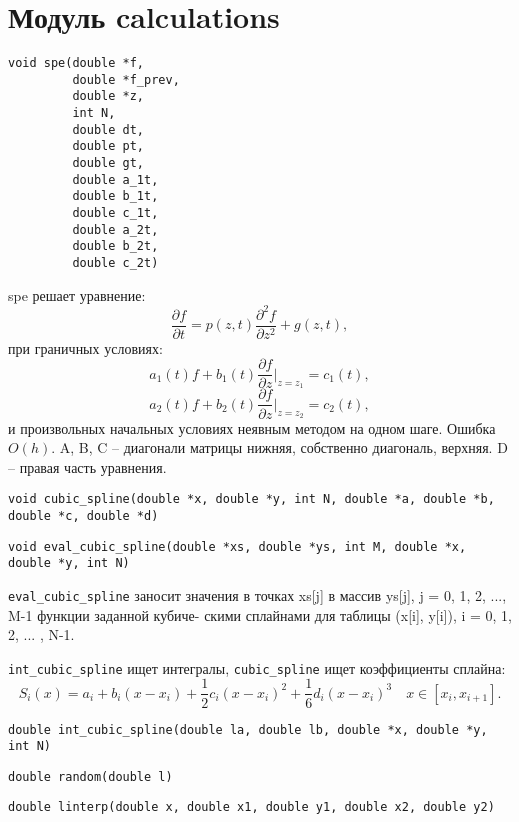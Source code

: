 \section{Модуль calculations}

\begin{verbatim}
void spe(double *f,
         double *f_prev,
         double *z,
         int N,
         double dt,
         double pt,
         double gt,
         double a_1t,
         double b_1t,
         double c_1t,
         double a_2t,
         double b_2t,
         double c_2t)
\end{verbatim}

spe решает уравнение:
\[
        \frac{\partial f}{\partial t} =
        p(z, t) \frac{\partial^2 f}{\partial z^2} + g(z, t),
\]
при граничных условиях:
\[
        a_1(t) f + b_1(t) \frac{\partial f}{\partial z} \Bigg|_{z = z_
1} = c_1(t),
\]
\[
        a_2(t) f + b_2(t) \frac{\partial f}{\partial z} \Bigg|_{z = z_
2} = c_2(t),
\]
и произвольных начальных условиях неявным методом на одном шаге. Ошибка $O(h)$. A, B, C -- диагонали матрицы нижняя, собственно диагональ, верхняя. D -- правая часть уравнения.

\begin{verbatim}
void cubic_spline(double *x, double *y, int N, double *a, double *b, double *c, double *d)
\end{verbatim}

\begin{verbatim}
void eval_cubic_spline(double *xs, double *ys, int M, double *x, double *y, int N)
\end{verbatim}

\verb+eval_cubic_spline+ заносит значения в точках xs[j] в массив ys[j], j = 0,
1, 2, ..., M-1 функции заданной кубиче-
скими сплайнами для таблицы (x[i], y[i]), i = 0, 1, 2, ... , N-1. 

\verb+int_cubic_spline+ ищет интегралы, \verb+cubic_spline+ ищет коэффициенты сплайна:
\[
    S_i(x) = a_i + b_i (x - x_i) + \frac{1}{2} c_i (x - x_i)^2 + \frac{1}{6} d_i (x - x_i)^3
    \quad x\in[x_i, x_{i+1}].
\]


\begin{verbatim}
double int_cubic_spline(double la, double lb, double *x, double *y, int N)
\end{verbatim}

\begin{verbatim}
double random(double l)
\end{verbatim}

\begin{verbatim}
double linterp(double x, double x1, double y1, double x2, double y2)
\end{verbatim}
